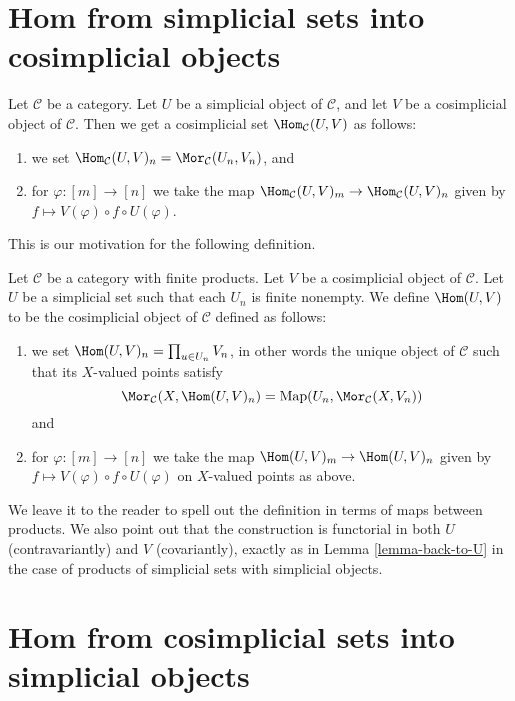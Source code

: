 \section{Hom from simplicial sets into cosimplicial objects}
\label{section-hom-from-simplicial-sets-into-cosimplicial}

\noindent
Let $\mathcal{C}$ be a category.
Let $U$ be a simplicial object of $\mathcal{C}$,
and let $V$ be a cosimplicial object of $\mathcal{C}$.
Then we get a cosimplicial set $\Hom_\mathcal{C}(U, V)$
as follows:
\begin{enumerate}
\item we set
$\Hom_\mathcal{C}(U, V)_n = \Mor_\mathcal{C}(U_n, V_n)$, and
\item for $\varphi : [m] \to [n]$ we take the map
$\Hom_\mathcal{C}(U, V)_m \to \Hom_\mathcal{C}(U, V)_n$
given by $f \mapsto V(\varphi) \circ f \circ U(\varphi)$.
\end{enumerate}
This is our motivation for the following definition.

\begin{definition}
\label{definition-hom-deltak-cosimplicial}
Let $\mathcal{C}$ be a category with finite products.
Let $V$ be a cosimplicial object of $\mathcal{C}$.
Let $U$ be a simplicial set such that each
$U_n$ is finite nonempty.
We define {\it $\Hom(U, V)$} to be
the cosimplicial object of $\mathcal{C}$ defined
as follows:
\begin{enumerate}
\item we set $\Hom(U, V)_n = \prod_{u \in U_n} V_n$,
in other words the unique object of $\mathcal{C}$ such
that its $X$-valued points satisfy
$$
\Mor_\mathcal{C}(X, \Hom(U, V)_n)
=
\text{Map}(U_n, \Mor_\mathcal{C}(X, V_n))
$$
and
\item for $\varphi : [m] \to [n]$ we take the map
$\Hom(U, V)_m \to \Hom(U, V)_n$
given by $f \mapsto V(\varphi) \circ f \circ U(\varphi)$
on $X$-valued points as above.
\end{enumerate}
\end{definition}

\noindent
We leave it to the reader to spell out the
definition in terms of maps between products.
We also point out that the construction is functorial
in both $U$ (contravariantly) and $V$ (covariantly), exactly as in
Lemma \ref{lemma-back-to-U} in the case of
products of simplicial sets with simplicial objects.




\section{Hom from cosimplicial sets into simplicial objects}
\label{section-hom-from-cosimplicial-sets-into-simplicial}


